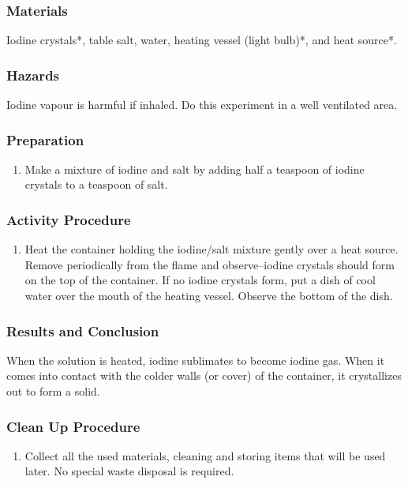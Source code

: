 \subsubsection*{Materials}
Iodine crystals*, table salt, water, heating vessel (light bulb)*, and heat source*.
\subsubsection*{Hazards}
Iodine vapour is harmful if inhaled. Do this experiment in a well ventilated area.
\subsubsection*{Preparation}
\begin{enumerate}
\item{Make a mixture of iodine and salt by adding half a teaspoon of iodine crystals to a teaspoon of salt.}
\end{enumerate}

\subsubsection*{Activity Procedure}
\begin{enumerate}
\item{Heat the container holding the iodine/salt mixture gently over a heat source. Remove periodically from the flame and observe--iodine crystals should form on the top of the container. If no iodine crystals form, put a dish of cool water over the mouth of the heating vessel. Observe the bottom of the dish. }
\end{enumerate}

\subsubsection*{Results and Conclusion}
When the solution is heated, iodine sublimates to become iodine gas. When it comes into contact with the colder walls (or cover) of the container, it crystallizes out to form a solid.

\subsubsection*{Clean Up Procedure}
\begin{enumerate}
\item{Collect all the used materials, cleaning and storing items that will be used later. No special waste disposal is required.}
\end{enumerate}


